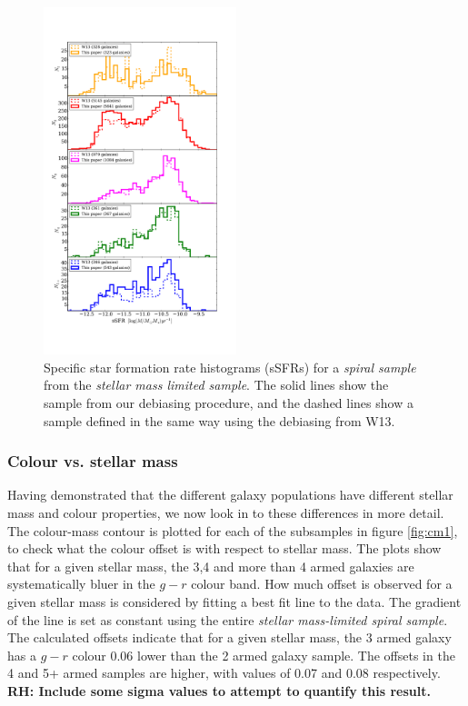 \documentclass[useAMS,usenatbib]{mn2e}
\newcommand{\rh}[1]{{\bf \textcolor{RoyalPurple}{RH: #1}}}
\begin{document}
\begin{figure}
		\centering
		
        \includegraphics[width=0.5\textwidth]{Histograms/ssfr_histogram.pdf}
		
        \caption{Specific star formation rate histograms (sSFRs) for a \textit{spiral sample} from the \textit{stellar mass limited sample}. The solid lines show the sample from our debiasing procedure, and the dashed lines show a sample defined in the same way using the debiasing from W13.}
		
        \label{fig:ssfr_histogram}
        
\end{figure}

\subsubsection{Colour vs. stellar mass}
\label{sec:colour_mass}

Having demonstrated that the different galaxy populations have different stellar mass and colour properties, we now look in to these differences in more detail. The colour-mass contour is plotted for each of the subsamples in figure \ref{fig:cm1}, to check what the colour offset is with respect to stellar mass. The plots show that for a given stellar mass, the 3,4 and more than 4 armed galaxies are systematically bluer in the $g-r$ colour band. How much offset is observed for a given stellar mass is considered by fitting a best fit line to the data. The gradient of the line is set as constant using the entire \textit{stellar mass-limited spiral sample}. The calculated offsets indicate that for a given stellar mass, the 3 armed galaxy has a $g-r$ colour 0.06 lower than the 2 armed galaxy sample. The offsets in the 4 and 5+ armed samples are higher, with values of 0.07 and 0.08 respectively. \rh{Include some sigma values to attempt to quantify this result.}
\end{document}
